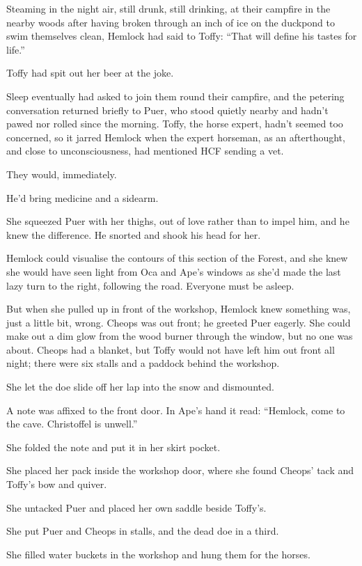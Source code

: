 \documentclass[11pt,a5paper]{article}
\begin{document}
Steaming in the night air, still drunk, still drinking, at their campfire in the nearby woods after having broken through an inch of ice on the duckpond to swim themselves clean, Hemlock had said to Toffy: ``That will define his tastes for life.''

Toffy had spit out her beer at the joke.

Sleep eventually had asked to join them round their campfire, and the petering conversation returned briefly to Puer, who stood quietly nearby and hadn't pawed nor rolled since the morning. Toffy, the horse expert, hadn't seemed too concerned, so it jarred Hemlock when the expert horseman, as an afterthought, and close to unconsciousness, had mentioned HCF sending a vet.

They would, immediately.

He'd bring medicine and a sidearm.

\vspace{1em}

She squeezed Puer with her thighs, out of love rather than to impel him, and he knew the difference. He snorted and shook his head for her.

Hemlock could visualise the contours of this section of the Forest, and she knew she would have seen light from Oca and Ape's windows as she'd made the last lazy turn to the right, following the road. Everyone must be asleep.

But when she pulled up in front of the workshop, Hemlock knew something was, just a little bit, wrong. Cheops was out front; he greeted Puer eagerly. She could make out a dim glow from the wood burner through the window, but no one was about. Cheops had a blanket, but Toffy would not have left him out front all night; there were six stalls and a paddock behind the workshop.

She let the doe slide off her lap into the snow and dismounted.

A note was affixed to the front door. In Ape's hand it read: ``Hemlock, come to the cave. Christoffel is unwell.''

She folded the note and put it in her skirt pocket.

She placed her pack inside the workshop door, where she found Cheops' tack and Toffy's bow and quiver.

She untacked Puer and placed her own saddle beside Toffy's.

She put Puer and Cheops in stalls, and the dead doe in a third.

She filled water buckets in the workshop and hung them for the horses.
\end{document}
